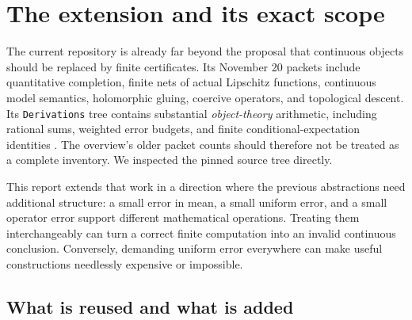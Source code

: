 \section{The extension and its exact scope}\label{sec:scope}

The current repository is already far beyond the proposal that continuous
objects should be replaced by finite certificates. Its November 20 packets
include quantitative completion, finite nets of actual Lipschitz functions,
continuous model semantics, holomorphic gluing, coercive operators, and
topological descent. Its \texttt{Derivations} tree contains substantial
\emph{object-theory} arithmetic, including rational sums, weighted error
budgets, and finite conditional-expectation identities
\cite{repo-overview,repo-derivations,repo-abstract,repo-continuous-two}.
The overview's older packet counts should therefore not be treated as a
complete inventory. We inspected the pinned source tree directly.

This report extends that work in a direction where the previous abstractions
need additional structure: a small error in mean, a small uniform error, and
a small operator error support different mathematical operations. Treating
them interchangeably can turn a correct finite computation into an invalid
continuous conclusion. Conversely, demanding uniform error everywhere can
make useful constructions needlessly expensive or impossible.

\subsection{What is reused and what is added}

